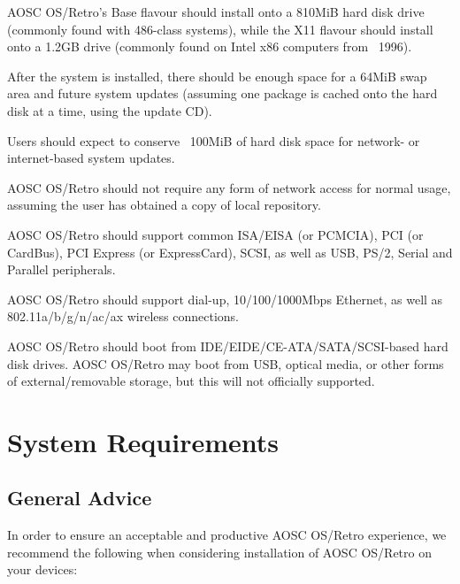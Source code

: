     \begin{compactitem}
        \item AOSC OS/Retro's Base flavour should install onto a 810MiB hard disk drive (commonly found with 486-class systems), while the X11 flavour should install onto a 1.2GB drive (commonly found on Intel x86 computers from ~1996).
            \begin{compactitem}
                \item After the system is installed, there should be enough space for a 64MiB swap area and future system updates (assuming one package is cached onto the hard disk at a time, using the update CD).
                \item Users should expect to conserve ~100MiB of hard disk space for network- or internet-based system updates.
            \end{compactitem}
        \item AOSC OS/Retro should not require any form of network access for normal usage, assuming the user has obtained a copy of local repository.
        \item AOSC OS/Retro should support common ISA/EISA (or PCMCIA), PCI (or CardBus), PCI Express (or ExpressCard), SCSI, as well as USB, PS/2, Serial and Parallel peripherals.
        \item AOSC OS/Retro should support dial-up, 10/100/1000Mbps Ethernet, as well as 802.11a/b/g/n/ac/ax wireless connections.
        \item AOSC OS/Retro should boot from IDE/EIDE/CE-ATA/SATA/SCSI-based hard disk drives. AOSC OS/Retro may boot from USB, optical media, or other forms of external/removable storage, but this will not officially supported.
    \end{compactitem}





    \chapter{System Requirements}

    \section{General Advice}

    In order to ensure an acceptable and productive AOSC OS/Retro experience, we recommend the following when considering installation of AOSC OS/Retro on your devices:

